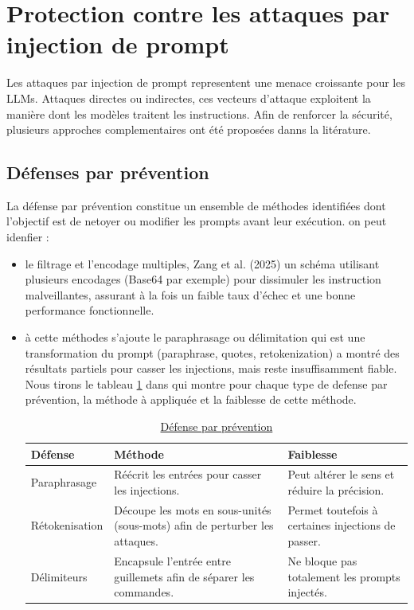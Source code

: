 	
\section{Protection contre les attaques par injection de prompt}
	Les attaques par injection de prompt representent une menace croissante pour les LLMs. Attaques directes ou indirectes, ces vecteurs d'attaque exploitent la manière dont les modèles traitent les instructions. Afin de renforcer la sécurité, plusieurs approches complementaires ont été proposées danns la litérature.
	\subsection{Défenses par prévention}
		La défense par prévention constitue un ensemble de méthodes identifiées dont l'objectif est de netoyer ou modifier les prompts avant leur exécution. on peut idenfier :
		\begin{itemize}
			\item le filtrage et l'encodage multiples, Zang et al. (2025) un schéma utilisant plusieurs encodages (Base64 par exemple) pour dissimuler les instruction malveillantes, assurant à la fois un faible taux d'échec et une bonne performance fonctionnelle\cite{zhang_defense_2025}.
			\item à cette méthodes s'ajoute le paraphrasage ou délimitation qui est une transformation du prompt (paraphrase, quotes, retokenization) a montré des résultats partiels pour casser les injections, mais reste insuffisamment fiable. Nous tirons le tableau \ref{tab3} dans \cite{zhang_formalizing_2025} qui montre pour chaque type de defense par prévention, la méthode à appliquée et la faiblesse de cette méthode.
			\begin{table}[h]
				\begin{tabular}{|l|p{6cm}|p{6cm}|}
					\hline
					\textbf{Défense} & \textbf{Méthode} & \textbf{Faiblesse} \\
					\hline
					Paraphrasage & Réécrit les entrées pour casser les injections. & Peut altérer le sens et réduire la précision.  \\
					\hline
					Rétokenisation & Découpe les mots en sous-unités (sous-mots) afin de perturber les attaques.& Permet toutefois à certaines injections de passer.\\
					\hline
					Délimiteurs & Encapsule l’entrée entre guillemets afin de séparer les commandes. & Ne bloque pas totalement les prompts injectés.\\
					\hline
				\end{tabular}
				\caption{\underline{Défense par prévention}}
				\label{tab3}
			\end{table}
		\end{itemize}
		

